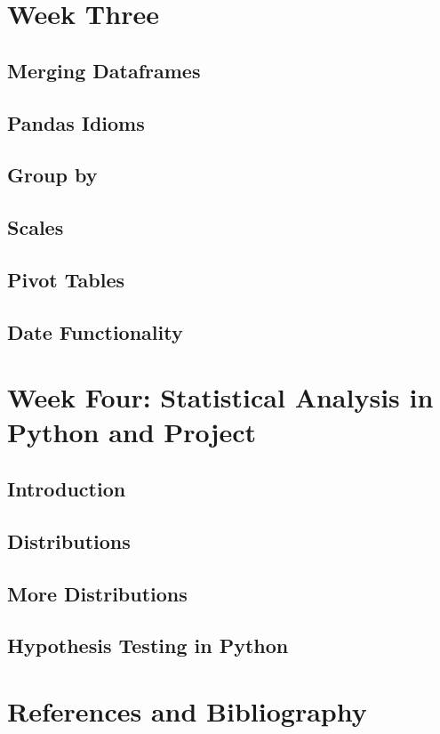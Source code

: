 \documentclass[11pt]{article}
\begin{document}
\newpage
\section{Week Three}

    \subsection{Merging Dataframes}
    \subsection{Pandas Idioms}
    \subsection{Group by}
    \subsection{Scales}
    \subsection{Pivot Tables}
    \subsection{Date Functionality}




\newpage
\section{Week Four: Statistical Analysis in Python and Project}
    \subsection{Introduction}
    \subsection{Distributions}
    \subsection{More Distributions}
    \subsection{Hypothesis Testing in Python}



















\section{References and Bibliography}






\end{document}
